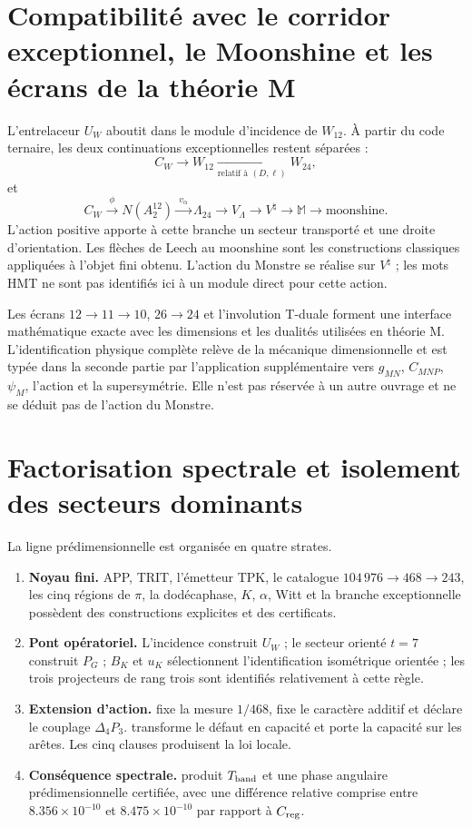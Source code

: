 \section{Compatibilité avec le corridor exceptionnel, le Moonshine et les écrans de la théorie M}

L’entrelaceur \(U_W\) aboutit dans le module d’incidence de \(W_{12}\).
À partir du code ternaire, les deux continuations exceptionnelles restent
séparées :
\[
 C_W\longrightarrow W_{12}
 \xrightarrow[\text{relatif à }(D,\ell)]{}W_{24},
\]
et
\[
 C_W\xrightarrow{\ \phi\ } N(A_2^{12})
\xrightarrow{\ v_\alpha\ }\Lambda_{24}
\longrightarrow V_\Lambda
\longrightarrow V^\natural
\longrightarrow\mathbb M
\longrightarrow\text{moonshine}.
\]
L’action positive apporte à cette branche un secteur transporté et une droite
d’orientation. Les flèches de Leech au moonshine sont les constructions
classiques appliquées à l’objet fini obtenu. L’action du Monstre se
réalise sur \(V^\natural\) ; les mots HMT ne sont pas identifiés ici à un
module direct pour cette action.

Les écrans \(12\to11\to10\), \(26\to24\) et l’involution T-duale forment
une interface mathématique exacte avec les dimensions et les dualités utilisées en
théorie M. L’identification physique complète relève de la mécanique
dimensionnelle et est typée dans la seconde partie par l’application supplémentaire vers
\(g_{MN}\), \(C_{MNP}\), \(\psi_M\), l’action et la supersymétrie. Elle n’est pas réservée
à un autre ouvrage et ne se déduit pas de l’action du Monstre.

\section{Factorisation spectrale et isolement des secteurs dominants}

La ligne prédimensionnelle est organisée en quatre strates.
\begin{enumerate}
  \item \textbf{Noyau fini.} APP, TRIT, l’émetteur TPK, le catalogue
  \(104\,976\to468\to243\), les cinq régions de \(\pi\), la
  dodécaphase, \(K\), \(\alpha\), Witt et la branche exceptionnelle possèdent
  des constructions explicites et des certificats.
  \item \textbf{Pont opératoriel.} L’incidence construit \(U_W\) ;
  le secteur orienté \(t=7\) construit \(P_G\) ; \(B_K\) et \(u_K\) sélectionnent
  l’identification isométrique orientée ; les trois projecteurs de rang trois
  sont identifiés relativement à cette règle.
  \item \textbf{Extension d’action.} \HTr fixe la mesure \(1/468\), \HAdd
  fixe le caractère additif et \HDef déclare le couplage
  \(\Delta_4P_3\). \HRes transforme le défaut en capacité et \HLoc porte la
  capacité sur les arêtes. Les cinq clauses produisent la loi locale.
  \item \textbf{Conséquence spectrale.} \Gtr produit
  \(T_{\rm band}\) et une phase angulaire prédimensionnelle certifiée, avec
  une différence relative comprise entre \(8.356\times10^{-10}\) et
  \(8.475\times10^{-10}\) par rapport à \(C_{\rm reg}\).
\end{enumerate}


